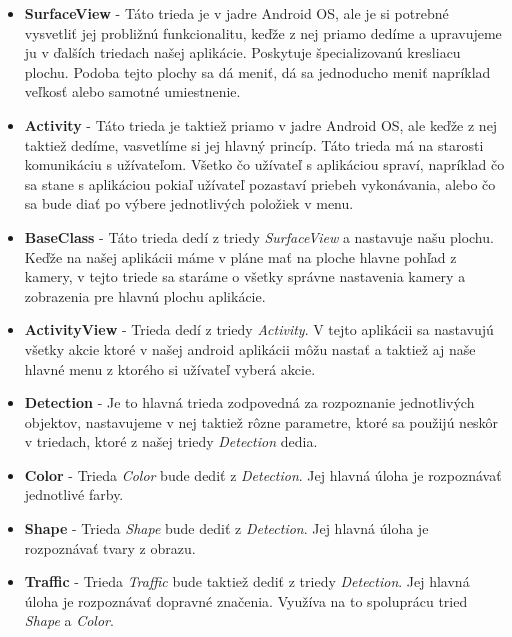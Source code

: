 \documentclass[12pt]{article}
\begin{document}
\begin{itemize}
  \item \textbf{SurfaceView} - Táto trieda je v jadre Android OS, ale je si potrebné vysvetliť jej probližnú funkcionalitu, keďže z nej priamo dedíme a upravujeme ju v ďalších triedach našej aplikácie.
  Poskytuje špecializovanú kresliacu plochu. Podoba tejto plochy sa dá meniť, dá sa jednoducho meniť napríklad veľkosť alebo samotné umiestnenie. \cite{android_dev}
  \item \textbf{Activity} - Táto trieda je taktiež priamo v jadre Android OS, ale keďže z nej taktiež dedíme, vasvetlíme si jej hlavný princíp.
  Táto trieda má na starosti komunikáciu s užívateľom. Všetko čo užívateľ s aplikáciou spraví, napríklad čo sa stane s aplikáciou pokiaľ užívateľ pozastaví priebeh vykonávania, alebo čo sa bude diať po výbere jednotlivých položiek v menu. \cite{android_dev}
  \item \textbf{BaseClass} - Táto trieda dedí z triedy \emph{SurfaceView} a nastavuje našu plochu. Keďže na našej aplikácii máme v pláne mať na ploche hlavne pohľad z kamery, v tejto triede sa staráme o všetky správne nastavenia kamery a zobrazenia pre hlavnú plochu aplikácie.
  \item \textbf{ActivityView} - Trieda dedí z triedy \emph{Activity}. V tejto aplikácii sa nastavujú všetky akcie ktoré v našej android aplikácii môžu nastať a taktiež aj naše hlavné menu z ktorého si užívateľ vyberá akcie.
  \item \textbf{Detection} - Je to hlavná trieda zodpovedná za rozpoznanie jednotlivých objektov, nastavujeme v nej taktiež rôzne parametre, ktoré sa použijú neskôr v triedach, ktoré z našej triedy \emph{Detection} dedia.
  \item \textbf{Color} - Trieda \emph{Color} bude dediť z \emph{Detection}. Jej hlavná úloha je rozpoznávať jednotlivé farby.
  \item \textbf{Shape} - Trieda \emph{Shape} bude dediť z \emph{Detection}. Jej hlavná úloha je rozpoznávať tvary z obrazu.
  \item \textbf{Traffic} - Trieda \emph{Traffic} bude taktiež dediť z triedy \emph{Detection}. Jej hlavná úloha je rozpoznávať dopravné značenia. Využíva na to spoluprácu tried \emph{Shape} a \emph{Color}.
\end{itemize}
\end{document}
